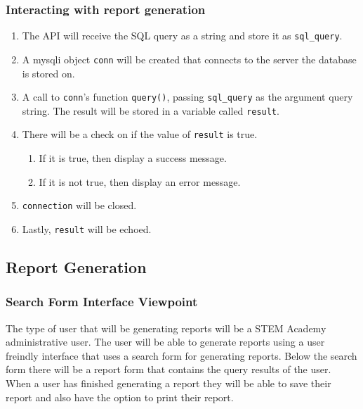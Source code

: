 \documentclass[letterpaper,10pt,serif, draftclsnofoot,onecolumn, compsoc, titlepage]{IEEEtran}
\begin{document}
\subsubsection{Interacting with report generation}
\begin{enumerate}
	\item The API will receive the SQL query as a string and store it as \texttt{sql\_query}.
	\item A mysqli object \texttt{conn} will be created that connects to the server the database is stored on.
	\item A call to \texttt{conn}'s function \texttt{query()}, passing \texttt{sql\_query} as the argument query string.
				The result will be stored in a variable called \texttt{result}.
	\item There will be a check on if the value of \texttt{result} is true.
	\begin{enumerate}
		\item If it is true, then display a success message.
		\item If it is not true, then display an error message.
	\end{enumerate}
	\item \texttt{connection} will be closed.
	\item Lastly, \texttt{result} will be echoed.
\end{enumerate}



\subsection{Report Generation}

\subsubsection{Search Form Interface Viewpoint}
The type of user that will be generating reports will be a STEM Academy administrative user. The user will be able to generate reports using a user freindly interface that uses a search form for generating reports. Below the search form there will be a report form that contains the query results of the user. When a user has finished generating a report they will be able to save their report and also have the option to print their report. 
\end{document}
